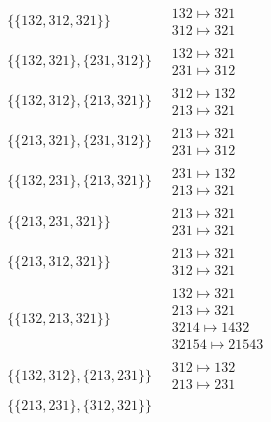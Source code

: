 \begin{scriptsize}
\begin{align}
\begin{matrix}
\end{matrix}
\\
\{\{132, 312, 321\}\}
\ 
&
\begin{matrix}
132 \mapsto 321
\\
312 \mapsto 321
\end{matrix}
\\
\{\{132, 321\}, \{231, 312\}\}
\ 
&
\begin{matrix}
132 \mapsto 321
\\
231 \mapsto 312
\end{matrix}
\\
\{\{132, 312\}, \{213, 321\}\}
\ 
&
\begin{matrix}
312 \mapsto 132
\\
213 \mapsto 321
\end{matrix}
\\
\{\{213, 321\}, \{231, 312\}\}
\ 
&
\begin{matrix}
213 \mapsto 321
\\
231 \mapsto 312
\end{matrix}
\\
\{\{132, 231\}, \{213, 321\}\}
\ 
&
\begin{matrix}
231 \mapsto 132
\\
213 \mapsto 321
\end{matrix}
\\
\{\{213, 231, 321\}\}
\ 
&
\begin{matrix}
213 \mapsto 321
\\
231 \mapsto 321
\end{matrix}
\\
\{\{213, 312, 321\}\}
\ 
&
\begin{matrix}
213 \mapsto 321
\\
312 \mapsto 321
\end{matrix}
\\
\{\{132, 213, 321\}\}
\ 
&
\begin{matrix}
132 \mapsto 321
\\
213 \mapsto 321
\\
3214 \mapsto 1432
\\
32154 \mapsto 21543
\end{matrix}
\\
\{\{132, 312\}, \{213, 231\}\}
\ 
&
\begin{matrix}
312 \mapsto 132
\\
213 \mapsto 231
\end{matrix}
\\
\{\{213, 231\}, \{312, 321\}\}
\ 
&
\begin{matrix}

\end{matrix}
\end{align}
\end{scriptsize}
